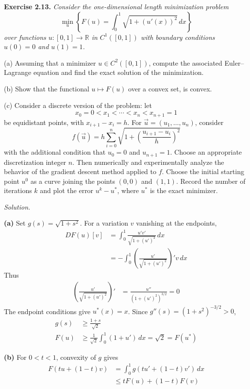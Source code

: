 \documentclass[12pt,letterpaper]{article}
\newcommand{\exercise}[1]{%
  \par\bigskip\noindent\textbf{Exercise #1.}\enspace}
\newenvironment{statement}{\itshape\ignorespaces}{\par}
\newcommand{\solution}{\par\medskip\noindent\textit{Solution.}\enspace}
\newcommand{\partlabel}[1]{\par\medskip\noindent\textbf{(#1)}\enspace}
\begin{document}
\newpage
\begin{samepage}
\exercise{2.13}
\begin{statement}
Consider the one-dimensional length minimization problem
\[
\min_u\left\{F(u)=\int_0^1\sqrt{1+(u'(x))^2}\,dx\right\}
\]
over functions $u:[0,1]\to\mathbb R$ in $C^1([0,1])$ with boundary conditions $u(0)=0$ and $u(1)=1$.
\par\smallskip
(a) Assuming that a minimizer $u\in C^2([0,1])$, compute the associated Euler--Lagrange equation and find the exact solution of the minimization.
\par\smallskip
(b) Show that the functional $u\mapsto F(u)$ over a convex set, is convex.
\par\smallskip
(c) Consider a discrete version of the problem: let
\[
x_0=0<x_1<\cdots<x_n<x_{n+1}=1
\]
be equidistant points, with $x_{i+1}-x_i=h$. For $\vec u=(u_1,\ldots,u_n)$, consider
\[
f(\vec u)=h\sum_{i=0}^n\sqrt{1+\left(\frac{u_{i+1}-u_i}{h}\right)^2}
\]
with the additional condition that $u_0=0$ and $u_{n+1}=1$. Choose an appropriate discretization integer $n$. Then numerically and experimentally analyze the behavior of the gradient descent method applied to $f$. Choose the initial starting point $u^0$ as a curve joining the points $(0,0)$ and $(1,1)$. Record the number of iterations $k$ and plot the error $u^k-u^*$, where $u^*$ is the exact minimizer.
\end{statement}
\end{samepage}
\solution
\partlabel{a}
Set $g(s)=\sqrt{1+s^2}$. For a variation $v$ vanishing at the endpoints,
\begin{align*}
 DF(u)[v]
 &=\int_0^1\frac{u'v'}{\sqrt{1+(u')^2}}\,dx\\
 &=-\int_0^1\left(\frac{u'}{\sqrt{1+(u')^2}}\right)'v\,dx
\end{align*}
Thus
\begin{align*}
 \left(\frac{u'}{\sqrt{1+(u')^2}}\right)'
 &=\frac{u''}{(1+(u')^2)^{3/2}}=0
\end{align*}
The endpoint conditions give $u^*(x)=x$.
Since $g''(s)=(1+s^2)^{-3/2}>0$,
\begin{align*}
 g(s)&\ge\frac{1+s}{\sqrt2}\\
 F(u)&\ge\frac1{\sqrt2}\int_0^1(1+u')\,dx=\sqrt2=F(u^*)
\end{align*}

\newpage
\partlabel{b}
For $0<t<1$, convexity of $g$ gives
\begin{align*}
 F(tu+(1-t)v)
 &=\int_0^1g(tu'+(1-t)v')\,dx\\
 &\le tF(u)+(1-t)F(v)
\end{align*}
\end{document}
